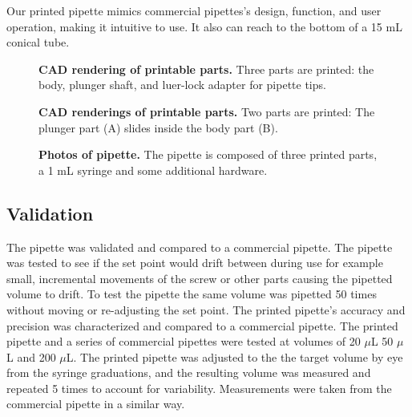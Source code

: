 \documentclass[10pt,letterpaper]{article}
\begin{document}
Our printed pipette mimics commercial pipettes's design, function, and user operation, making it intuitive to use.
It also can reach to the bottom of a 15 mL conical tube.



\begin{figure}
\caption{
{\bf CAD rendering of printable parts.}  Three parts are printed: the body, plunger shaft, and luer-lock adapter for pipette tips.
}
\label{fig1}
\end{figure}

\begin{figure}
\caption{
{\bf CAD renderings of printable parts.} Two parts are printed: The plunger part (A) slides inside the body part (B).
}
\label{fig1}
\end{figure}

\begin{figure}
\caption{
{\bf Photos of pipette.}  The pipette is composed of three printed parts, a 1 mL syringe and some additional hardware.  
}
\label{fig3}
\end{figure}

\subsection*{Validation}
The pipette was validated and compared to a commercial pipette. 
The pipette was tested to see if the set point would drift between during use for example small, incremental movements of the screw or other parts causing the pipetted volume to drift. 
To test the pipette the same volume was pipetted 50 times without moving or re-adjusting the set point. 
The printed pipette’s accuracy and precision was characterized and compared to a commercial pipette. 
The printed pipette and a series of commercial pipettes were tested at volumes of 20 $\mu$L 50 $\mu$L and 200 $\mu$L. 
The printed pipette was adjusted to the the target volume by eye from the syringe graduations, and the resulting volume was measured and repeated 5 times to account for variability.
Measurements were taken from the commercial pipette in a similar way.
\end{document}
